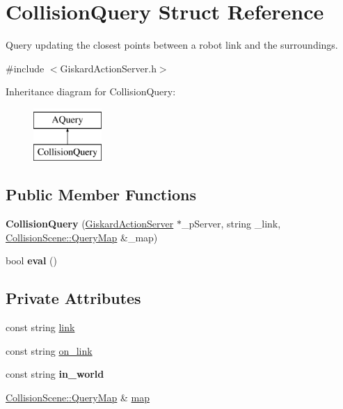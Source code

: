 \hypertarget{structCollisionQuery}{\section{Collision\-Query Struct Reference}
\label{structCollisionQuery}
}


Query updating the closest points between a robot link and the surroundings.  




{\ttfamily \#include $<$Giskard\-Action\-Server.\-h$>$}

Inheritance diagram for Collision\-Query\-:\begin{figure}[H]
\begin{center}
\leavevmode
\includegraphics[height=2.000000cm]{structCollisionQuery}
\end{center}
\end{figure}
\subsection*{Public Member Functions}
\begin{DoxyCompactItemize}
\item 
\hypertarget{structCollisionQuery_a684dad7ad6f5c3faedab8e1ffe064515}{{\bfseries Collision\-Query} (\hyperlink{classGiskardActionServer}{Giskard\-Action\-Server} $\ast$\-\_\-p\-Server, string \-\_\-link, \hyperlink{classMutexMap}{Collision\-Scene\-::\-Query\-Map} \&\-\_\-map)}\label{structCollisionQuery_a684dad7ad6f5c3faedab8e1ffe064515}

\item 
\hypertarget{structCollisionQuery_a306f589988aa5e5b455a8bac2467b323}{bool {\bfseries eval} ()}\label{structCollisionQuery_a306f589988aa5e5b455a8bac2467b323}

\end{DoxyCompactItemize}
\subsection*{Private Attributes}
\begin{DoxyCompactItemize}
\item 
const string \hyperlink{structCollisionQuery_ad29d6393aec770b2975e5fe43f121ae1}{link}
\item 
const string \hyperlink{structCollisionQuery_a1f32be858524ab1886b7def2b5cfea69}{on\-\_\-link}
\item 
\hypertarget{structCollisionQuery_ad64ac9509d640282a47d726df7e1849e}{const string {\bfseries in\-\_\-world}}\label{structCollisionQuery_ad64ac9509d640282a47d726df7e1849e}

\item 
\hyperlink{classMutexMap}{Collision\-Scene\-::\-Query\-Map} \& \hyperlink{structCollisionQuery_a014c3155faa91f550e82d6cf70cc1670}{map}
\end{DoxyCompactItemize}

